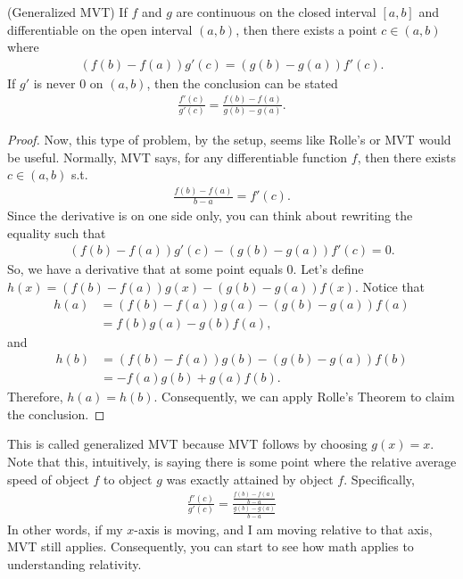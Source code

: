 \documentclass{ximera}
\begin{document}
\begin{theorem}{(Generalized MVT)}
    If $f$ and $g$ are continuous on the closed interval $[a,b]$ and differentiable on the open interval $(a,b)$, then there exists a point $c \in (a,b)$ where
    \begin{align*}
        (f(b) -f(a))g'(c) = (g(b) - g(a))f'(c).
    \end{align*}
    If $g'$ is never $0$ on $(a,b)$, then the conclusion can be stated
    \begin{align*}
        \frac{f'(c)}{g'(c)} = \frac{f(b) - f(a)}{g(b)-g(a)}.
    \end{align*}
\end{theorem}
\begin{proof}
    Now, this type of problem, by the setup, seems like Rolle's or MVT would be useful.  Normally, MVT says, for any differentiable function $f$, then there exists $c \in (a,b)$ s.t.
    \begin{align*}
        \frac{f(b) - f(a)}{b-a} = f'(c).
    \end{align*}
    Since the derivative is on one side only, you can think about rewriting the equality such that 
      \begin{align*}
        (f(b) -f(a))g'(c) - (g(b) - g(a))f'(c) = 0.
    \end{align*}
    So, we have a derivative that at some point equals $0$.
    Let's define $h(x) =(f(b) -f(a))g(x) - (g(b) - g(a))f(x)$.  Notice that 
    \begin{align*}
        h(a) &= (f(b) - f(a))g(a) - (g(b) - g(a))f(a) 
        \\
        &= f(b)g(a) - g(b)f(a),
    \end{align*}
    and 
    \begin{align*}
        h(b) &= (f(b) - f(a))g(b) - (g(b) - g(a))f(b)\\
        &= -f(a) g(b) +g(a)f(b).
    \end{align*}
    Therefore, $h(a) = h(b)$.  Consequently, we can apply Rolle's Theorem to claim the conclusion.
\end{proof}

This is called generalized MVT because MVT follows by choosing $g(x) = x.$  Note that this, intuitively, is saying there is some point where the relative average speed of object $f$ to object $g$ was exactly attained by object $f$. Specifically,
\begin{align*}
\frac{f'(c)}{g'(c)} = \frac{\frac{f(b) - f(a)}{b-a}}{\frac{g(b) - g(a)}{b-a}}
\end{align*}
In other words, if my $x$-axis is moving, and I am moving relative to that axis, MVT still applies.  Consequently, you can start to see how math applies to understanding relativity.
\end{document}
